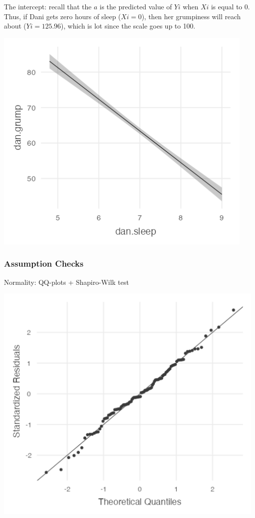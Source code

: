 \documentclass[
]{article}
\begin{document}
The intercept: recall that the \(a\) is the predicted value of \(Yi\) when \(Xi\) is equal to 0. Thus, if Dani gets zero hours of sleep (\(Xi = 0\)), then her grumpiness will reach about (\(Yi = 125.96\)), which is lot since the scale goes up to 100.

\includegraphics{images/paste-802AADA8.png}

\hypertarget{assumption-checks}{%
\subsubsection{Assumption Checks}\label{assumption-checks}}

Normality: QQ-plots + Shapiro-Wilk test

\includegraphics{images/paste-D10A6EBB.png}
\end{document}
